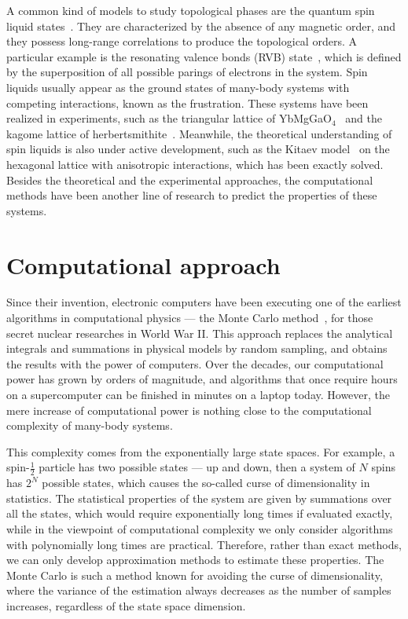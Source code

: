 A common kind of models to study topological phases are the quantum spin liquid states~\cite{balents2010spin, misguich2011quantum, mila2015frustrated}. They are characterized by the absence of any magnetic order, and they possess long-range correlations to produce the topological orders. A particular example is the resonating valence bonds (RVB) state~\cite{anderson1973resonating}, which is defined by the superposition of all possible parings of electrons in the system. Spin liquids usually appear as the ground states of many-body systems with competing interactions, known as the frustration. These systems have been realized in experiments, such as the triangular lattice of YbMgGaO$_4$~\cite{li2015rare} and the kagome lattice of herbertsmithite~\cite{norman2016colloquium}. Meanwhile, the theoretical understanding of spin liquids is also under active development, such as the Kitaev model~\cite{kitaev2006anyons} on the hexagonal lattice with anisotropic interactions, which has been exactly solved. Besides the theoretical and the experimental approaches, the computational methods have been another line of research to predict the properties of these systems.

\section{Computational approach}

Since their invention, electronic computers have been executing one of the earliest algorithms in computational physics --- the Monte Carlo method~\cite{metropolis1949monte}, for those secret nuclear researches in World War II. This approach replaces the analytical integrals and summations in physical models by random sampling, and obtains the results with the power of computers. Over the decades, our computational power has grown by orders of magnitude, and algorithms that once require hours on a supercomputer can be finished in minutes on a laptop today. However, the mere increase of computational power is nothing close to the computational complexity of many-body systems.

This complexity comes from the exponentially large state spaces. For example, a spin-$\frac{1}{2}$ particle has two possible states --- up and down, then a system of $N$ spins has $2^N$ possible states, which causes the so-called curse of dimensionality in statistics. The statistical properties of the system are given by summations over all the states, which would require exponentially long times if evaluated exactly, while in the viewpoint of computational complexity we only consider algorithms with polynomially long times are practical. Therefore, rather than exact methods, we can only develop approximation methods to estimate these properties. The Monte Carlo is such a method known for avoiding the curse of dimensionality, where the variance of the estimation always decreases as the number of samples increases, regardless of the state space dimension.

